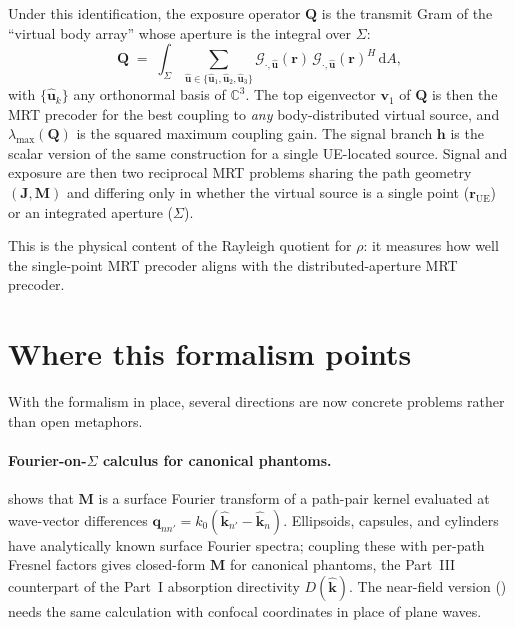 \documentclass[11pt,a4paper]{article}
\theoremstyle{definition}
\newcommand{\khat}{\hat{\bm{k}}}
\newcommand{\rr}{\mathbf{r}}
\newcommand{\diff}{\mathrm{d}}
\newcommand{\Complex}{\mathbb{C}}
\newcommand{\Jmat}{\mathbf{J}}                 %
\newcommand{\Mmat}{\mathbf{M}}                 %
\newcommand{\Qmat}{\mathbf{Q}}                 %
\newcommand{\Sigmabody}{\Sigma}
\newcommand{\vv}{\mathbf{v}}
\begin{document}
Under this identification, the exposure operator $\Qmat$ is the transmit
Gram of the ``virtual body array'' whose aperture is the integral over
$\Sigmabody$:
\begin{equation}\label{eq:reciprocity}
  \Qmat\;=\;\int_\Sigmabody\sum_{\hat{\mathbf u}\in\{\hat{\mathbf u}_1,\hat{\mathbf u}_2,\hat{\mathbf u}_3\}}
  \mathcal G_{\cdot,\hat{\mathbf u}}(\rr)\,\mathcal G_{\cdot,\hat{\mathbf u}}(\rr)^H\,\diff A,
\end{equation}
with $\{\hat{\mathbf u}_k\}$ any orthonormal basis of $\Complex^3$.  The
top eigenvector $\vv_1$ of $\Qmat$ is then the MRT precoder for the best
coupling to \emph{any} body-distributed virtual source, and
$\lambda_{\max}(\Qmat)$ is the squared maximum coupling gain.  The
signal branch $\mathbf h$ is the scalar version of the same construction
for a single UE-located source.  Signal and exposure are then two
reciprocal MRT problems sharing the path geometry $(\Jmat,\Mmat)$ and
differing only in whether the virtual source is a single point
($\rr_\mathrm{UE}$) or an integrated aperture ($\Sigmabody$).

This is the physical content of the Rayleigh quotient for $\rho$: it
measures how well the single-point MRT precoder aligns with the
distributed-aperture MRT precoder.

\section{Where this formalism points}\label{sec:outlook}

With the formalism in place, several directions are now concrete
problems rather than open metaphors.

\paragraph{Fourier-on-$\Sigmabody$ calculus for canonical phantoms.}
 shows that $\Mmat$ is a surface Fourier transform of a
path-pair kernel evaluated at wave-vector differences
$\mathbf q_{nn'}=k_0(\khat_{n'}-\khat_n)$.  Ellipsoids, capsules, and
cylinders have analytically known surface Fourier spectra; coupling these
with per-path Fresnel factors gives closed-form $\Mmat$ for canonical
phantoms, the Part~III counterpart of the Part~I absorption directivity
$D(\khat)$.  The near-field version () needs the same
calculation with confocal coordinates in place of plane waves.
\end{document}
